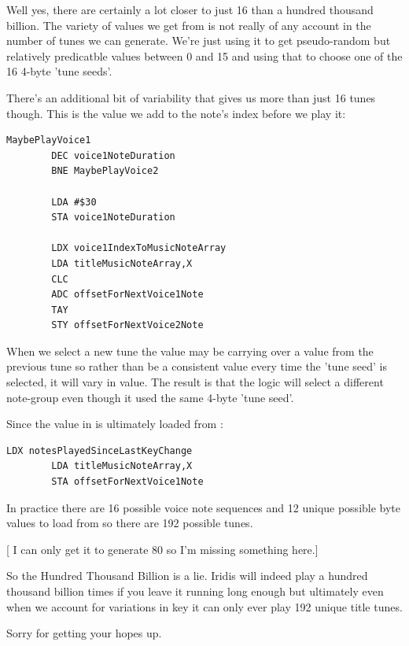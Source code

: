 Well yes, there are certainly a lot closer to just 16 than a hundred thousand billion. The variety of values we get
from  is not really of any account in the number of tunes we can generate. We're just using it to get pseudo-random but
relatively predicatble values between 0 and 15 and using that to choose one of the 16 4-byte 'tune seeds'.

There's an additional bit of variability that gives us more than just 16 tunes though. This is the value we add to
the note's index before we play it:

\begin{lstlisting}[caption=\icode{offsetForNextVoice1Note} introduces additional tune permutations.]
MaybePlayVoice1   
        DEC voice1NoteDuration
        BNE MaybePlayVoice2

        LDA #$30
        STA voice1NoteDuration

        LDX voice1IndexToMusicNoteArray
        LDA titleMusicNoteArray,X
        CLC
        ADC offsetForNextVoice1Note
        TAY
        STY offsetForNextVoice2Note
\end{lstlisting}

When we select a new tune the value  may be carrying over a value from the previous tune so
rather than be a consistent value every time the 'tune seed' is selected, it will vary in value. The result is that the
logic will select a different note-group even though it used the same 4-byte 'tune seed'.

Since the value in  is ultimately loaded from :

\begin{lstlisting}[caption=\icode{offsetForNextVoice1Note} is loaded from \icode{titleMusicNoteArray} and is propagated down
to \icode{offsetForNextVoice3Note}.]
        LDX notesPlayedSinceLastKeyChange
        LDA titleMusicNoteArray,X
        STA offsetForNextVoice1Note
\end{lstlisting}

In practice there are 16 possible voice note sequences and 12 unique possible byte values to load from 
so there are 192 possible tunes.

[ I can only get it to generate 80 so I'm missing something here.]

So the Hundred Thousand Billion is a lie. Iridis will indeed play a hundred thousand billion times if you 
leave it running long enough but ultimately even when we account for variations in key it can only ever play
192 unique title tunes.

Sorry for getting your hopes up.



